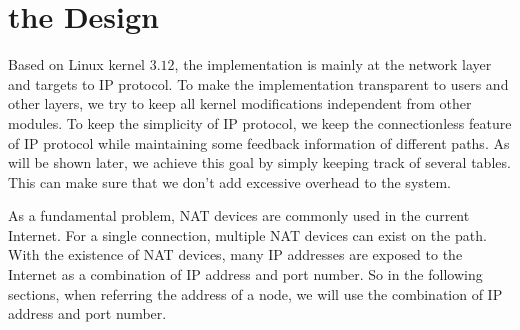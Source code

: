 \section{the Design}
\label{sec:design}
Based on Linux kernel $3.12$, the implementation is mainly at the network layer and targets to IP protocol. To make the implementation transparent to users and other layers, we try to keep all kernel modifications independent from other modules. To keep the simplicity of IP protocol, we keep the connectionless feature of IP protocol while maintaining some feedback information of different paths. As will be shown later, we achieve this goal by simply keeping track of several tables. This can make sure that we don't add excessive overhead to the system.

As a fundamental problem, NAT devices are commonly used in the current Internet. For a single connection, multiple NAT devices can exist on the path. With the existence of NAT devices, many IP addresses are exposed to the Internet as a combination of IP address and port number. So in the following sections, when referring the address of a node, we will use the combination of IP address and port number.


